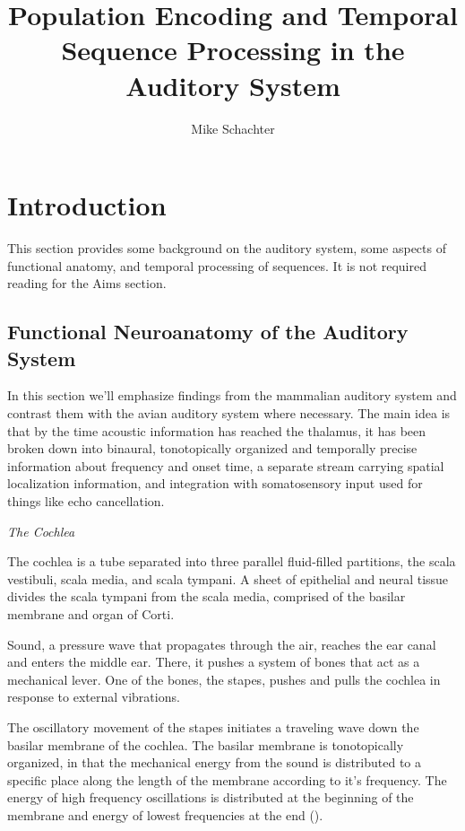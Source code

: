 \documentclass[12pt,article,oneside]{memoir}
\begin{document}
\title{Population Encoding and Temporal Sequence Processing in the Auditory System}
\author{Mike Schachter}
\maketitle

\tableofcontents*


\section{Introduction}

This section provides some background on the auditory system, some aspects of
functional anatomy, and temporal processing of sequences. It is not required
reading for the Aims section.

\subsection{Functional Neuroanatomy of the Auditory System}

In this section we'll emphasize findings from the mammalian auditory system
and contrast them with the avian auditory system where necessary. The main
idea is that by the time acoustic information has reached the thalamus, it
has been broken down into binaural, tonotopically organized and temporally precise
information about frequency and onset time, a separate stream carrying spatial localization
information, and integration with somatosensory input used for things like
echo cancellation.

\bigskip
\noindent \textit{The Cochlea}

The cochlea is a tube separated into three parallel fluid-filled partitions,
the scala vestibuli, scala media, and scala tympani. A sheet of epithelial
and neural tissue divides the scala tympani from the scala media, comprised
of the basilar membrane and organ of Corti. 

Sound, a pressure wave that propagates through the air, reaches the ear
canal and enters the middle ear. There, it pushes a system of bones that
act as a mechanical lever. One of the bones, the stapes, pushes and pulls
the cochlea in response to external vibrations.

The oscillatory movement of the stapes initiates a traveling wave down the basilar membrane
of the cochlea. The basilar membrane is tonotopically organized, in that the mechanical
energy from the sound is distributed to a specific place along the length of the membrane
according to it's frequency. The energy of high frequency oscillations is distributed at the beginning
of the membrane and energy of lowest frequencies at the end (\cite{Kandel2000}).
\end{document}
